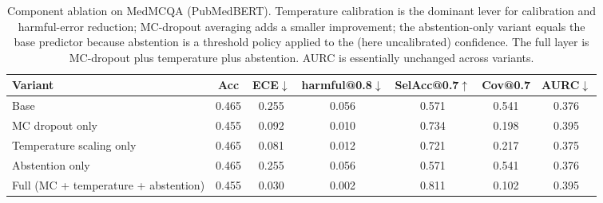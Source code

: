 \begin{table}[h]
\centering
\caption{Component ablation on MedMCQA (PubMedBERT). Temperature calibration is the dominant
lever for calibration and harmful-error reduction; MC-dropout averaging adds a smaller
improvement; the abstention-only variant equals the base predictor because abstention is a
threshold policy applied to the (here uncalibrated) confidence. The full layer is MC-dropout
plus temperature plus abstention. AURC is essentially unchanged across variants.}
\label{tab:ablation_components}
\renewcommand{\arraystretch}{1.15}
\small
\begin{tabular}{lcccccc}
\hline
\textbf{Variant} & \textbf{Acc} & \textbf{ECE}$\downarrow$ & \textbf{harmful@0.8}$\downarrow$ & \textbf{SelAcc@0.7}$\uparrow$ & \textbf{Cov@0.7} & \textbf{AURC}$\downarrow$ \\
\hline
Base & 0.465 & 0.255 & 0.056 & 0.571 & 0.541 & 0.376 \\
MC dropout only & 0.455 & 0.092 & 0.010 & 0.734 & 0.198 & 0.395 \\
Temperature scaling only & 0.465 & 0.081 & 0.012 & 0.721 & 0.217 & 0.375 \\
Abstention only & 0.465 & 0.255 & 0.056 & 0.571 & 0.541 & 0.376 \\
Full (MC + temperature + abstention) & 0.455 & 0.030 & 0.002 & 0.811 & 0.102 & 0.395 \\
\hline
\end{tabular}
\end{table}

